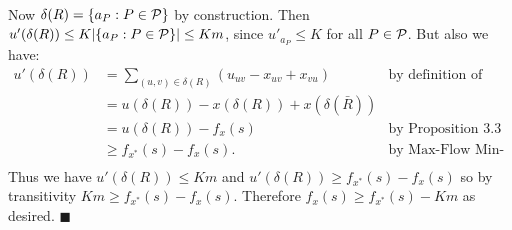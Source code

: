 \documentclass[letterpaper,12pt,oneside,onecolumn]{article}
\begin{document}
\paragraph{}
Now $\delta(R) = \{a_P : P \in \mathcal{P} \}$ by construction. Then $u'(\delta(R)) \leq K|\{a_P : P \in \mathcal{P} \}| \leq Km$, since $u'_{a_P} \leq K$ for all $P \in \mathcal{P}$. But also we have:
\begin{align*}
u'(\delta(R)) &= \sum_{(u,v) \in \delta(R)} (u_{uv} - x_{uv} + x_{vu}) &\text{by definition of residual capacity}\\
&= u(\delta(R)) - x(\delta(R)) + x(\delta(\bar{R})) \\
&= u(\delta(R)) - f_x(s) &\text{by Proposition $3.3$} \\
&\geq f_{x^*}(s) - f_x(s). &\text{by Max-Flow Min-Cut} \\
\end{align*}
Thus we have $u'(\delta(R)) \leq Km$ and $u'(\delta(R)) \geq f_{x^*}(s) - f_x(s)$ so by transitivity $Km \geq f_{x^*}(s) - f_x(s)$. Therefore $f_x(s) \geq f_{x^*}(s) - Km$ as desired. $\blacksquare$
\end{document}

